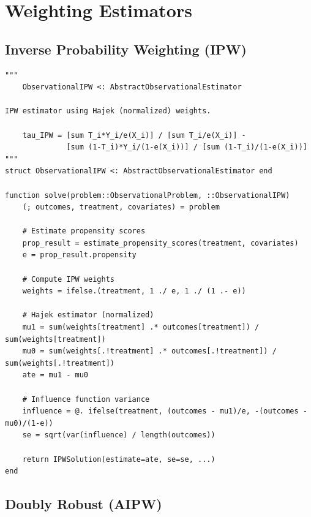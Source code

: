 \section{Weighting Estimators}
\label{sec:julia_weighting}

\subsection{Inverse Probability Weighting (IPW)}

\begin{verbatim}
"""
    ObservationalIPW <: AbstractObservationalEstimator

IPW estimator using Hajek (normalized) weights.

    tau_IPW = [sum T_i*Y_i/e(X_i)] / [sum T_i/e(X_i)] -
              [sum (1-T_i)*Y_i/(1-e(X_i))] / [sum (1-T_i)/(1-e(X_i))]
"""
struct ObservationalIPW <: AbstractObservationalEstimator end

function solve(problem::ObservationalProblem, ::ObservationalIPW)
    (; outcomes, treatment, covariates) = problem

    # Estimate propensity scores
    prop_result = estimate_propensity_scores(treatment, covariates)
    e = prop_result.propensity

    # Compute IPW weights
    weights = ifelse.(treatment, 1 ./ e, 1 ./ (1 .- e))

    # Hajek estimator (normalized)
    mu1 = sum(weights[treatment] .* outcomes[treatment]) / sum(weights[treatment])
    mu0 = sum(weights[.!treatment] .* outcomes[.!treatment]) / sum(weights[.!treatment])
    ate = mu1 - mu0

    # Influence function variance
    influence = @. ifelse(treatment, (outcomes - mu1)/e, -(outcomes - mu0)/(1-e))
    se = sqrt(var(influence) / length(outcomes))

    return IPWSolution(estimate=ate, se=se, ...)
end
\end{verbatim}

\subsection{Doubly Robust (AIPW)}


